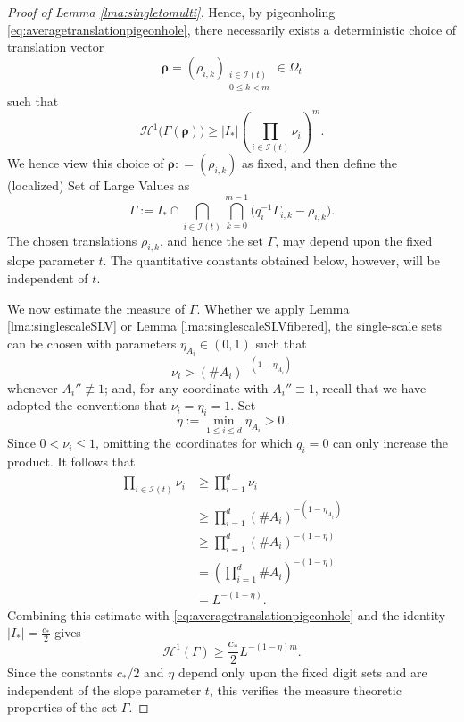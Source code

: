 \documentclass[12pt]{amsart}
\numberwithin{equation}{section}
\begin{document}
\begin{proof}[Proof of Lemma \ref{lma:singletomulti}]
Hence, by pigeonholing \eqref{eq:averagetranslationpigeonhole}, there necessarily exists a deterministic choice of translation vector
\[
\boldsymbol{\rho}
=
(\rho_{i,k})_{\substack{i\in\mathcal I(t)\\0\leq k<m}}
\in\Omega_t
\]
such that
\[
\mathcal H^1\bigl(\Gamma(\boldsymbol{\rho})\bigr)
\geq
|I_*|
\left(
\prod_{i\in\mathcal I(t)}\nu_i
\right)^m.
\]
We hence view this choice of $\bm{\rho} : = (\rho_{i,k})$ as fixed, and then define the (localized) Set of Large Values as
\begin{equation}\label{eq:nonperiodicmultiscalegamma}
\Gamma
:=
I_*\cap
\bigcap_{i\in\mathcal I(t)}
\bigcap_{k=0}^{m-1}
\bigl(q_i^{-1}\Gamma_{i,k}-\rho_{i,k}\bigr).
\end{equation}
The chosen translations $\rho_{i,k}$, and hence the set $\Gamma$, may depend upon the fixed slope parameter $t$.  The quantitative constants obtained below, however, will be independent of $t$.

We now estimate the measure of $\Gamma$.  Whether we apply Lemma
\ref{lma:singlescaleSLV} or Lemma
\ref{lma:singlescaleSLVfibered}, the single-scale sets can be chosen with parameters $\eta_{A_i}\in(0,1)$ such that
\[
\nu_i
>
(\#A_i)^{-(1-\eta_{A_i})}
\]
whenever $A_i''\not\equiv1$; and, for any coordinate with $A_i''\equiv1$, recall that we have adopted the conventions that $\nu_i = \eta_i = 1$.
Set
\[
\eta:=\min_{1\leq i\leq d}\eta_{A_i}>0.
\]
Since $0<\nu_i\leq1$, omitting the coordinates for which $q_i=0$ can only increase the product.  It follows that
\begin{align*}
\prod_{i\in\mathcal I(t)}\nu_i
&\geq
\prod_{i=1}^d\nu_i\\
&\geq
\prod_{i=1}^d
(\#A_i)^{-(1-\eta_{A_i})}\\
&\geq
\prod_{i=1}^d
(\#A_i)^{-(1-\eta)}\\
&=
\left(
\prod_{i=1}^d\#A_i
\right)^{-(1-\eta)}\\
&=
L^{-(1-\eta)}.
\end{align*}
Combining this estimate with \eqref{eq:averagetranslationpigeonhole} and the identity $|I_*|=\frac{c_*}{2}$ gives
\begin{equation}\label{eq:slopeuniformgammasize}
\mathcal H^1(\Gamma)
\geq
\frac{c_*}{2}L^{-(1-\eta)m}.
\end{equation}
Since the constants $c_*/2$ and $\eta$ depend only upon the fixed digit sets and are independent of the slope parameter $t$, this verifies the measure theoretic properties of the set $\Gamma$.


\end{proof}
\end{document}
